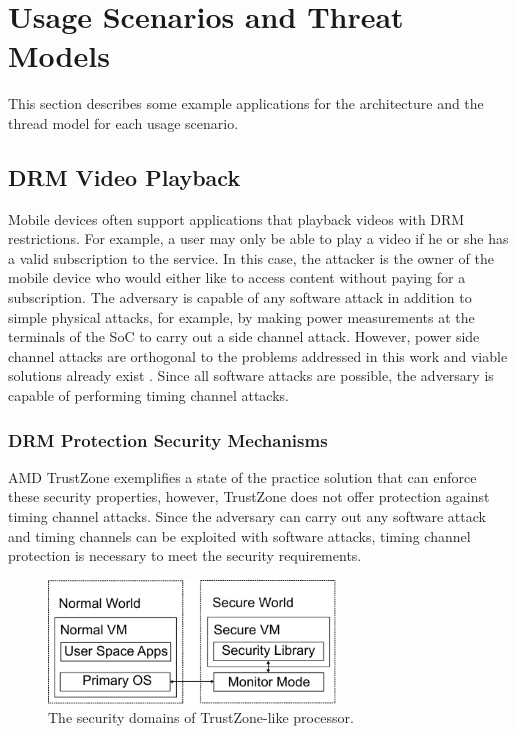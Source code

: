 \section{Usage Scenarios and Threat Models}

    This section describes some example applications for the architecture and 
    the thread model for each usage scenario.

    \subsection{DRM Video Playback}
    Mobile devices often support applications that playback videos with
    DRM restrictions. For example, a user may only be able to play a video if 
    he or she has a valid subscription to the service. In this case, the 
    attacker is the owner of the mobile device who would either like to access 
    content without paying for a subscription. The adversary is capable of any 
    software attack in addition to simple physical attacks, for example, by 
    making power measurements at the terminals of the SoC to carry out a side 
    channel attack. However, power side channel attacks are orthogonal to the 
    problems addressed in this work and viable solutions already exist 
    \cite{needed}. Since all software attacks are possible, the adversary is 
    capable of performing timing channel attacks. 

    \subsubsection{DRM Protection Security Mechanisms}
    AMD TrustZone \cite{trustzone} exemplifies a state of the practice solution 
    that can enforce these security properties, however, TrustZone does not 
    offer protection against timing channel attacks. Since the adversary can 
    carry out any software attack and timing channels can be exploited with 
    software attacks, timing channel protection is necessary to meet the 
    security requirements. 

    \begin{figure}
        \begin{center}
            \includegraphics[width=3in]{figs/worlds.pdf}
            \caption{The security domains of TrustZone-like processor.}
            \label{fig:tz_domains}
        \end{center}
    \end{figure}
    
